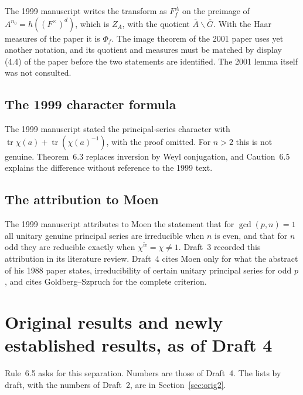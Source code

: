 \documentclass[12pt,letterpaper]{article}
\newcommand{\wt}{\tilde w}
\newcommand{\ZA}{Z_A}
\DeclareMathOperator{\tr}{tr}
\begin{document}
The 1999 manuscript writes the transform as $F_f^{\overline A}$ on the
preimage of $A^{n_0}=h((F^\times)^d)$, which is $\ZA$, with the quotient
$\overline A\backslash\overline G$. With the Haar measures of the paper
it is $\Phi_f$. The image theorem of the 2001 paper uses yet another
notation, and its quotient and measures must be matched by display (4.4)
of the paper before the two statements are identified. The 2001 lemma
itself was not consulted.

\subsection{The 1999 character formula}\label{subsec:g-moved}

The 1999 manuscript stated the principal-series character with
$\tr\chi(a)+\tr(\chi(a)^{-1})$, with the proof omitted. For $n>2$ this
is not genuine. Theorem~6.3 replaces inversion by Weyl
conjugation, and Caution~6.5 explains the difference without
reference to the 1999 text.

\subsection{The attribution to Moen}

The 1999 manuscript attributes to Moen the statement that for
$\gcd(p,n)=1$ all unitary genuine principal series are irreducible when
$n$ is even, and that for $n$ odd they are reducible exactly when
$\chi^{\wt}=\chi\ne1$. Draft~3 recorded this attribution in its
literature review. Draft~4 cites Moen only for what the abstract of his
1988 paper states, irreducibility of certain unitary principal series
for odd $p$, and cites Goldberg--Szpruch for the complete criterion.

\section{Original results and newly established results, as of Draft 4}
\label{sec:orig4}

Rule~6.5 asks for this separation. Numbers are those of Draft~4. The
lists by draft, with the numbers of Draft~2, are in
Section~\ref{sec:orig2}.
\end{document}
